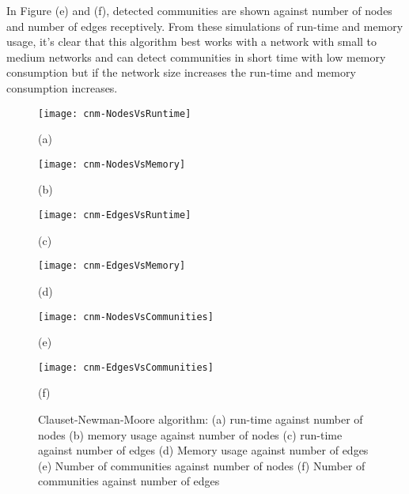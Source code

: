In Figure (e) and (f), detected communities are shown against number of nodes and number of edges receptively. From these simulations of run-time and memory usage, it's clear that this algorithm best works with a network with small to medium networks and can detect communities in short time with low memory consumption but if the network size increases the run-time and memory consumption increases.
\vfill
\pagebreak

\begin{figure}[H]
  \centering
  \begin{minipage}[b]{0.4\textwidth}
    \texttt{[image: cnm-NodesVsRuntime]}
    \caption*{(a)}
  \end{minipage}
  \begin{minipage}[b]{0.4\textwidth}
    \texttt{[image: cnm-NodesVsMemory]}
    \caption*{(b)}
  \end{minipage}
%
  \begin{minipage}[b]{0.4\textwidth}
    \texttt{[image: cnm-EdgesVsRuntime]}
    \caption*{(c)}
  \end{minipage}
  \begin{minipage}[b]{0.4\textwidth}
    \texttt{[image: cnm-EdgesVsMemory]}
    \caption*{(d)}
  \end{minipage}
%
  \begin{minipage}[b]{0.4\textwidth}
    \texttt{[image: cnm-NodesVsCommunities]}
    \caption*{(e)}
  \end{minipage}
  \begin{minipage}[b]{0.4\textwidth}
    \texttt{[image: cnm-EdgesVsCommunities]}
    \caption*{(f)}
  \end{minipage}
  \caption{Clauset-Newman-Moore algorithm: (a) run-time against number of nodes (b) memory usage against number of nodes (c) run-time against number of edges (d) Memory usage against number of edges (e) Number of communities against number of nodes (f) Number of communities against number of edges}
  \label{fig:CNM-runs}
\end{figure}

